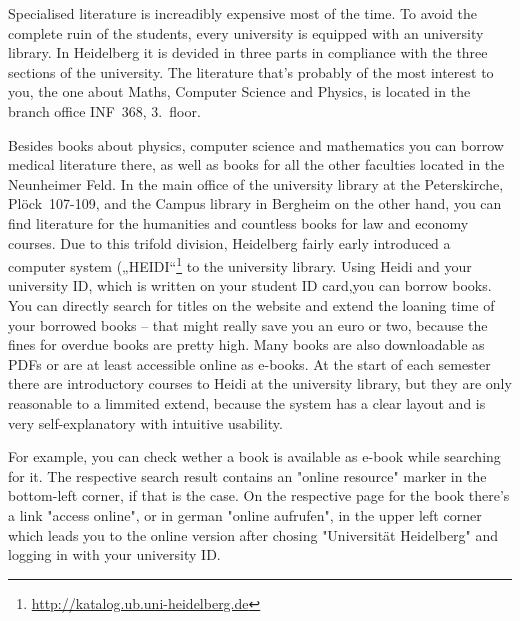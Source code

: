 \begin{table*}
\begin{tabular}{lll@{ -- }l@{\quad}r@{ -- }l@{ Uhr}}
\bottomrule
\end{tabular}

\end{table*}
Specialised literature is increadibly expensive most of the time. To avoid the complete ruin of the students, every university is equipped with an university library. In Heidelberg it is devided in three parts in compliance with the three sections of the university. The literature that's probably of the most interest to you, the one about Maths, Computer Science and Physics, is located in the branch office \gls{INF}~368, 3.~floor.

Besides books about physics, computer science and mathematics you can borrow medical literature there, as well as books for all the other faculties located in the Neunheimer Feld. In the main office of the university library at the Peterskirche, Plöck~107-109, and the Campus library in Bergheim on the other hand, you can find literature for the humanities and countless books for law and economy courses. Due to this trifold division, Heidelberg fairly early introduced a computer system („\gls{HEIDI}“\footnote{\url{http://katalog.ub.uni-heidelberg.de}} to the university library. Using Heidi and your university ID, which is written on your student ID card,you can borrow books. You can directly search for titles on the website and extend the loaning time of your borrowed books -- that might really save you an euro or two, because the fines for overdue books are pretty high. Many books are also downloadable as PDFs or are at least accessible online as e-books. At the start of each semester there are introductory courses to Heidi at the university library, but they are only reasonable to a limmited extend, because the system has a clear layout and is very self-explanatory with intuitive usability.

For example, you can check wether a book is available as e-book while searching for it. The respective search result contains an "online resource" marker in the bottom-left corner, if that is the case. On the respective page for the book there's a link "access online", or in german "online aufrufen", in the upper left corner which leads you to the online version after chosing "Universität Heidelberg" and logging in with your university ID. 
 
